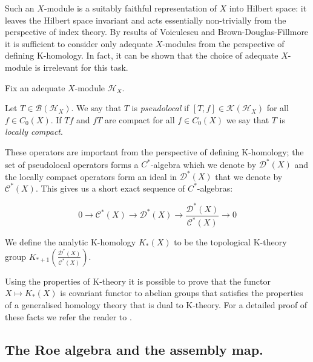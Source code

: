 \begin{remark}
Such an $X$-module is a suitably faithful representation of $X$ into Hilbert space: it leaves the Hilbert space invariant and acts essentially non-trivially from the perspective of index theory. By results of Voiculescu \cite{MR0415338} and Brown-Douglas-Fillmore \cite{MR0458196} it is sufficient to consider only adequate $X$-modules from the perspective of defining K-homology. In fact, it can be shown that the choice of adequate $X$-module is irrelevant for this task.
\end{remark}

Fix an adequate $X$-module $\mathcal{H}_{X}$.

\begin{definition}
Let $T \in \mathcal{B}(\mathcal{H}_{X})$. We say that $T$ is \textit{pseudolocal} if $[T,f] \in \mathcal{K}(\mathcal{H}_{X})$ for all $f \in C_{0}(X)$. If $Tf$ and $fT$ are compact for all $f \in C_{0}(X)$ we say that $T$ is \textit{locally compact}.
\end{definition}

These operators are important from the perspective of defining K-homology; the set of pseudolocal operators forms a $C^{*}$-algebra which we denote by $\mathcal{D}^{*}(X)$ and the locally compact operators form an ideal in $\mathcal{D}^{*}(X)$ that we denote by $\mathcal{C}^{*}(X)$. This gives us a short exact sequence of $C^{*}$-algebras:

\begin{equation*}
0 \rightarrow \mathcal{C}^{*}(X) \rightarrow \mathcal{D}^{*}(X) \rightarrow \frac{\mathcal{D}^{*}(X)}{\mathcal{C}^{*}(X)}\rightarrow 0
\end{equation*} 

\begin{definition}
We define the analytic K-homology $K_{*}(X)$ to be the topological K-theory group $K_{*+1}(\frac{\mathcal{D}^{*}(X)}{\mathcal{C}^{*}(X)})$.
\end{definition}

Using the properties of K-theory it is possible to prove that the functor $X \mapsto K_{*}(X)$ is covariant functor to abelian groups that satisfies the properties of a generalised homology theory that is dual to K-theory. For a detailed proof of these facts we refer the reader to \cite{MR1399087,MR1817560}.

\subsection{The Roe algebra and the assembly map.}

